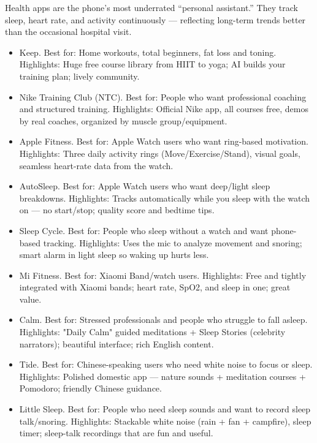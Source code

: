 
Health apps are the phone's most underrated “personal assistant.” They track sleep, heart rate, and activity continuously — reflecting long-term trends better than the occasional hospital visit.


\begin{itemize}
  \item Keep. Best for: Home workouts, total beginners, fat loss and toning. Highlights: Huge free course library from HIIT to yoga; AI builds your training plan; lively community.
  \item Nike Training Club (NTC). Best for: People who want professional coaching and structured training. Highlights: Official Nike app, all courses free, demos by real coaches, organized by muscle group/equipment.
  \item Apple Fitness. Best for: Apple Watch users who want ring-based motivation. Highlights: Three daily activity rings (Move/Exercise/Stand), visual goals, seamless heart-rate data from the watch.
\end{itemize}


\begin{itemize}
  \item AutoSleep. Best for: Apple Watch users who want deep/light sleep breakdowns. Highlights: Tracks automatically while you sleep with the watch on — no start/stop; quality score and bedtime tips.
  \item Sleep Cycle. Best for: People who sleep without a watch and want phone-based tracking. Highlights: Uses the mic to analyze movement and snoring; smart alarm in light sleep so waking up hurts less.
  \item Mi Fitness. Best for: Xiaomi Band/watch users. Highlights: Free and tightly integrated with Xiaomi bands; heart rate, SpO2, and sleep in one; great value.
\end{itemize}


\begin{itemize}
  \item Calm. Best for: Stressed professionals and people who struggle to fall asleep. Highlights: "Daily Calm" guided meditations + Sleep Stories (celebrity narrators); beautiful interface; rich English content.
  \item Tide. Best for: Chinese-speaking users who need white noise to focus or sleep. Highlights: Polished domestic app — nature sounds + meditation courses + Pomodoro; friendly Chinese guidance.
  \item Little Sleep. Best for: People who need sleep sounds and want to record sleep talk/snoring. Highlights: Stackable white noise (rain + fan + campfire), sleep timer; sleep-talk recordings that are fun and useful.
\end{itemize}

